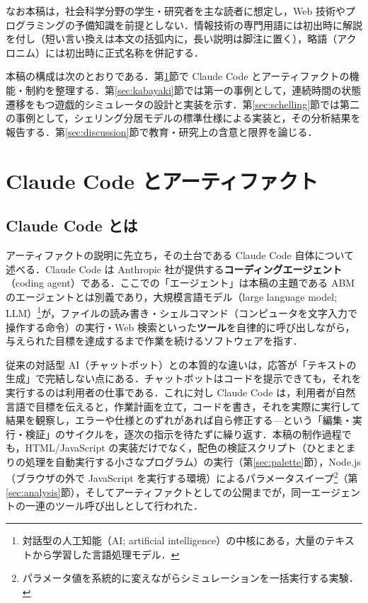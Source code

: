 \documentclass[a4paper]{jlreq}
\begin{document}
なお本稿は，社会科学分野の学生・研究者を主な読者に想定し，Web 技術やプログラミングの予備知識を前提としない．情報技術の専門用語には初出時に解説を付し（短い言い換えは本文の括弧内に，長い説明は脚注に置く），略語（アクロニム）には初出時に正式名称を併記する．

本稿の構成は次のとおりである．第\ref{sec:artifact}節で Claude Code とアーティファクトの機能・制約を整理する．第\ref{sec:kabayaki}節では第一の事例として，連続時間の状態遷移をもつ遊戯的シミュレータの設計と実装を示す．第\ref{sec:schelling}節では第二の事例として，シェリング分居モデルの標準仕様による実装と，その分析結果を報告する．第\ref{sec:discussion}節で教育・研究上の含意と限界を論じる．

\section{Claude Code とアーティファクト}\label{sec:artifact}

\subsection{Claude Code とは}

アーティファクトの説明に先立ち，その土台である Claude Code 自体について述べる．Claude Code は Anthropic 社が提供する\textbf{コーディングエージェント}（coding agent）である\cite{anthropic-claudecode}．ここでの「エージェント」は本稿の主題である ABM のエージェントとは別義であり，大規模言語モデル（large language model; LLM）\footnote{対話型の人工知能（AI; artificial intelligence）の中核にある，大量のテキストから学習した言語処理モデル．}が，ファイルの読み書き・シェルコマンド（コンピュータを文字入力で操作する命令）の実行・Web 検索といった\textbf{ツール}を自律的に呼び出しながら，与えられた目標を達成するまで作業を続けるソフトウェアを指す．

従来の対話型 AI（チャットボット）との本質的な違いは，応答が「テキストの生成」で完結しない点にある．チャットボットはコードを提示できても，それを実行するのは利用者の仕事である．これに対し Claude Code は，利用者が自然言語で目標を伝えると，作業計画を立て，コードを書き，それを実際に実行して結果を観察し，エラーや仕様とのずれがあれば自ら修正する—という「編集・実行・検証」のサイクルを，逐次の指示を待たずに繰り返す．本稿の制作過程でも，HTML/JavaScript の実装だけでなく，配色の検証スクリプト（ひとまとまりの処理を自動実行する小さなプログラム）の実行（第\ref{sec:palette}節），Node.js（ブラウザの外で JavaScript を実行する環境）によるパラメータスイープ\footnote{パラメータ値を系統的に変えながらシミュレーションを一括実行する実験．}（第\ref{sec:analysis}節），そしてアーティファクトとしての公開までが，同一エージェントの一連のツール呼び出しとして行われた．
\end{document}
